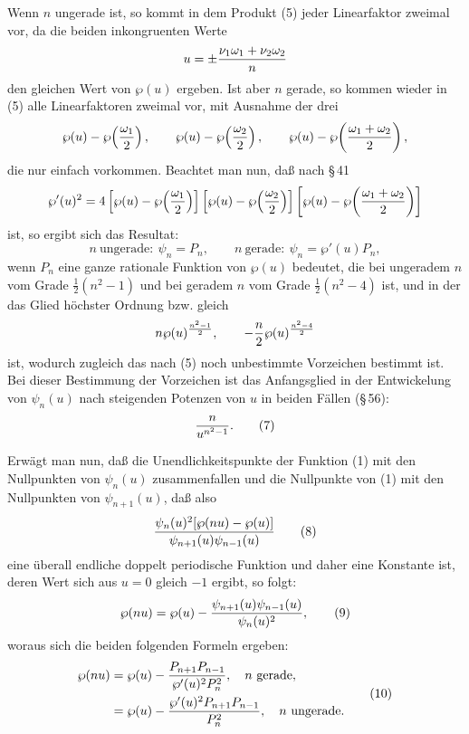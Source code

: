 \documentclass[11pt]{article}
\begin{document}
Wenn $n$ ungerade ist, so kommt in dem Produkt (5) jeder Linearfaktor zweimal vor,
da die beiden inkongruenten Werte
\[
u=\pm{\nu_1\omega_1+\nu_2\omega_2\over n}
\]
den gleichen Wert von $\wp(u)$ ergeben. Ist aber $n$ gerade, so kommen wieder in (5) alle
Linearfaktoren zweimal vor, mit Ausnahme der drei
\[
\wp(u)-\wp\!\left({\omega_1\over2}\right),\qquad
\wp(u)-\wp\!\left({\omega_2\over2}\right),\qquad
\wp(u)-\wp\!\left({\omega_1+\omega_2\over2}\right),
\]
die nur einfach vorkommen. Beachtet man nun, daß nach \S\,41
\[
\wp'(u)^2=
4\left[\wp(u)-\wp\!\left({\omega_1\over2}\right)\right]
\left[\wp(u)-\wp\!\left({\omega_2\over2}\right)\right]
\left[\wp(u)-\wp\!\left({\omega_1+\omega_2\over2}\right)\right]
\]
ist, so ergibt sich das Resultat:
\begin{equation}
n\ \text{ungerade}:\ \psi_n=P_n,\qquad
n\ \text{gerade}:\ \psi_n=\wp'(u)P_n,
\tag{6}
\end{equation}
wenn $P_n$ eine ganze rationale Funktion von $\wp(u)$ bedeutet, die bei ungeradem $n$
vom Grade $\frac12(n^2-1)$ und bei geradem $n$ vom Grade $\frac12(n^2-4)$ ist, und in
der das Glied höchster Ordnung bzw. gleich
\[
n\wp(u)^{\frac{n^2-1}{2}},\qquad -{n\over2}\wp(u)^{\frac{n^2-4}{2}}
\]
ist, wodurch zugleich das nach (5) noch unbestimmte Vorzeichen bestimmt ist. Bei dieser
Bestimmung der Vorzeichen ist das Anfangsglied in der Entwickelung von $\psi_n(u)$ nach
steigenden Potenzen von $u$ in beiden Fällen (\S\,56):
\begin{equation}
{n\over u^{n^2-1}}.
\tag{7}
\end{equation}

Erwägt man nun, daß die Unendlichkeitspunkte der Funktion (1) mit den Nullpunkten von
$\psi_n(u)$ zusammenfallen und die Nullpunkte von (1) mit den Nullpunkten von
$\psi_{n+1}(u)$, daß also
\begin{equation}
{\psi_n(u)^2[\wp(nu)-\wp(u)]\over \psi_{n+1}(u)\psi_{n-1}(u)}
\tag{8}
\end{equation}
eine überall endliche doppelt periodische Funktion und daher eine Konstante ist, deren
Wert sich aus $u=0$ gleich $-1$ ergibt, so folgt:
\begin{equation}
\wp(nu)=\wp(u)-{\psi_{n+1}(u)\psi_{n-1}(u)\over \psi_n(u)^2},
\tag{9}
\end{equation}
woraus sich die beiden folgenden Formeln ergeben:
\begin{equation}
\begin{aligned}
\wp(nu)&=\wp(u)-{P_{n+1}P_{n-1}\over \wp'(u)^2P_n^2},\quad n\ \text{gerade},\\
&=\wp(u)-{\wp'(u)^2P_{n+1}P_{n-1}\over P_n^2},\quad n\ \text{ungerade}.
\end{aligned}
\tag{10}
\end{equation}
\end{document}
